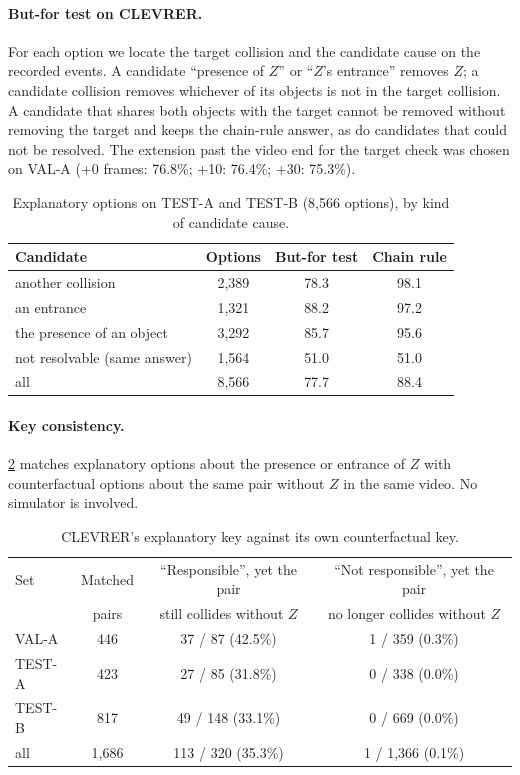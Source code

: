 \documentclass[10pt,onecolumn,letterpaper]{article}
\begin{document}
\paragraph{But-for test on CLEVRER.}
For each option we locate the target collision and the candidate cause on the recorded events.
A candidate ``presence of $Z$'' or ``$Z$'s entrance'' removes $Z$; a candidate collision removes whichever of its objects is not in the target collision.
A candidate that shares both objects with the target cannot be removed without removing the target and keeps the chain-rule answer, as do candidates that could not be resolved.
The extension past the video end for the target check was chosen on VAL-A (+0 frames: 76.8\%; +10: 76.4\%; +30: 75.3\%).

\begin{table}[h]
\caption{Explanatory options on TEST-A and TEST-B (8,566 options), by kind of candidate cause.}
\label{tab:butfor}
\centering
\small
\begin{tabular}{@{}lccc@{}}
\toprule
Candidate & Options & But-for test & Chain rule \\
\midrule
another collision & 2,389 & 78.3 & 98.1 \\
an entrance & 1,321 & 88.2 & 97.2 \\
the presence of an object & 3,292 & 85.7 & 95.6 \\
not resolvable (same answer) & 1,564 & 51.0 & 51.0 \\
\midrule
all & 8,566 & 77.7 & 88.4 \\
\bottomrule
\end{tabular}
\end{table}

\paragraph{Key consistency.}
\cref{tab:consistency} matches explanatory options about the presence or entrance of $Z$ with counterfactual options about the same pair without $Z$ in the same video. No simulator is involved.

\begin{table}[h]
\caption{CLEVRER's explanatory key against its own counterfactual key.}
\label{tab:consistency}
\centering
\small
\begin{tabular}{@{}lccc@{}}
\toprule
Set & Matched & ``Responsible'', yet the pair & ``Not responsible'', yet the pair \\
 & pairs & still collides without $Z$ & no longer collides without $Z$ \\
\midrule
VAL-A & 446 & 37 / 87 (42.5\%) & 1 / 359 (0.3\%) \\
TEST-A & 423 & 27 / 85 (31.8\%) & 0 / 338 (0.0\%) \\
TEST-B & 817 & 49 / 148 (33.1\%) & 0 / 669 (0.0\%) \\
\midrule
all & 1,686 & 113 / 320 (35.3\%) & 1 / 1,366 (0.1\%) \\
\bottomrule
\end{tabular}
\end{table}
\end{document}
